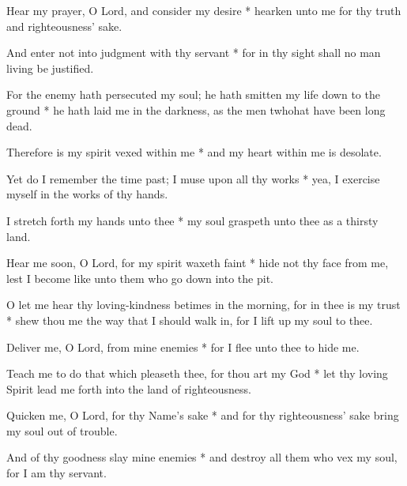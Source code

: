 Hear my prayer, O Lord, and consider my desire * hearken unto me for thy truth and righteousness' sake.

And enter not into judgment with thy servant * for in thy sight shall no man living be justified.

For the enemy hath persecuted my soul; he hath smitten my life down to the ground * he hath laid me in the darkness, as the men twhohat have been long dead.

Therefore is my spirit vexed within me * and my heart within me is desolate.

Yet do I remember the time past; I muse upon all thy works * yea, I exercise myself in the works of thy hands.

I stretch forth my hands unto thee * my soul graspeth unto thee as a thirsty land.

Hear me soon, O Lord, for my spirit waxeth faint * hide not thy face from me, lest I become like unto them who go down into the pit.

O let me hear thy loving-kindness betimes in the morning, for in thee is my trust * shew thou me the way that I should walk in, for I lift up my soul to thee.

Deliver me, O Lord, from mine enemies * for I flee unto thee to hide me.

Teach me to do that which pleaseth thee, for thou art my God * let thy loving Spirit lead me forth into the land of righteousness.

Quicken me, O Lord, for thy Name's sake * and for thy righteousness' sake bring my soul out of trouble.

And of thy goodness slay mine enemies * and destroy all them who vex my soul, for I am thy servant.